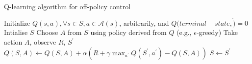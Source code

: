 \bgroup
\begin{frame}{Q-learning algorithm for off-policy control}
\begin{algorithmic}
\STATE Initialize $Q(s,a), \forall s \in S, a \in \mathcal{A}(s)$, arbitrarily, and $Q(terminal-state, \dot)=0$
\STATE Intialise $S$
\STATE Choose $A$ from $S$ using policy derived from $Q$ (e.g., $\epsilon$-greedy)
\STATE Take action $A$, observe $R$, $S^{\prime}$
\STATE $Q(S,A) \leftarrow Q(S,A) + \alpha (R + \gamma \max_{a^{\prime}}Q(S^{\prime}, a^{\prime}) - Q(S,A))$
\STATE $S \leftarrow S^{\prime}$
\ENDFOR
\ENDFOR
\end{algorithmic}
\end{frame}
\egroup